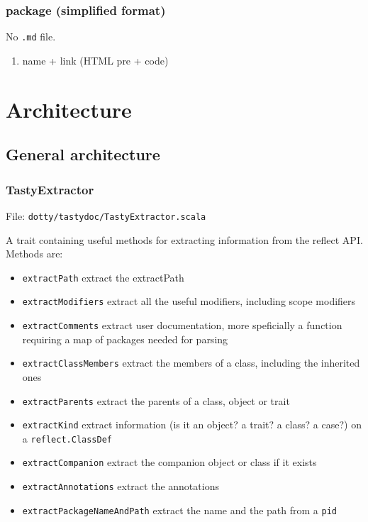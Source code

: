 \documentclass{report}
\begin{document}
\subsection{package (simplified format)}
No \texttt{.md} file.

\label{sec:packageSignatureSec}
\begin{enumerate}
    \item name + link (HTML pre + code)
\end{enumerate}

\chapter{Architecture}

\section{General architecture}
\subsection{TastyExtractor}
File: \texttt{dotty/tastydoc/TastyExtractor.scala}

A trait containing useful methods for extracting information from the reflect API. Methods are:
\begin{itemize}
    \item \texttt{extractPath} extract the extractPath
    \item \texttt{extractModifiers} extract all the useful modifiers, including scope modifiers
    \item \texttt{extractComments} extract user documentation, more speficially a function requiring a map of packages needed for parsing
    \item \texttt{extractClassMembers} extract the members of a class, including the inherited ones
    \item \texttt{extractParents} extract the parents of a class, object or trait
    \item \texttt{extractKind} extract information (is it an object? a trait? a class? a case?) on a \texttt{reflect.ClassDef}
    \item \texttt{extractCompanion} extract the companion object or class if it exists
    \item \texttt{extractAnnotations} extract the annotations
    \item \texttt{extractPackageNameAndPath} extract the name and the path from a \texttt{pid}
\end{itemize}
\end{document}
